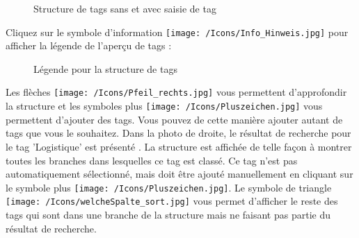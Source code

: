 \begin{figure}[H]
\caption{Structure de tags sans et avec saisie de tag}
\end{figure}

Cliquez sur le symbole d'information \texttt{[image: /Icons/Info\_Hinweis.jpg]}  pour afficher la légende de l'aperçu de tags :

\begin{figure}[H]
\caption{Légende pour la structure de tags}
\end{figure}

Les flèches \texttt{[image: /Icons/Pfeil\_rechts.jpg]} vous permettent d'approfondir la structure et les symboles plus \texttt{[image: /Icons/Pluszeichen.jpg]} vous permettent d'ajouter des tags. Vous pouvez de cette manière ajouter autant de tags que vous le souhaitez. Dans la photo de droite, le résultat de recherche pour le tag 'Logistique' est présenté . La structure est affichée de telle façon à montrer toutes les branches dans lesquelles ce tag est classé. Ce tag n'est pas automatiquement sélectionné, mais doit être ajouté manuellement en cliquant sur le symbole plus \texttt{[image: /Icons/Pluszeichen.jpg]}. Le symbole de triangle \texttt{[image: /Icons/welcheSpalte\_sort.jpg]} vous permet d'afficher le reste des tags qui sont dans une branche de la structure mais ne faisant pas partie du résultat de recherche. \newline

